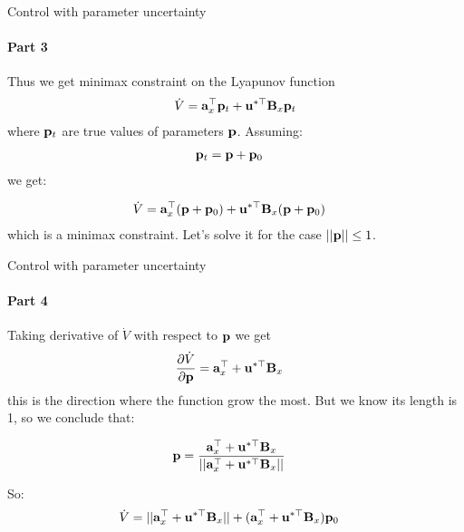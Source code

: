\documentclass{beamer}
\begin{document}
\begin{frame}{Control with parameter uncertainty}
\framesubtitle{Part 3}
\begin{flushleft}

Thus we get minimax constraint on the Lyapunov function
%
\begin{align}
\dot{V} = \mathbf{a}_x^\top \mathbf{p}_t + 
\mathbf{u}^{*\top} \mathbf{B}_x \mathbf{p}_t
\end{align}
%
where $\mathbf{p}_t$ are true values of parameters $\mathbf{p}$. Assuming:
%
\begin{align}
& \mathbf{p}_t = \mathbf{p} + \mathbf{p}_0
\end{align}
%
we get:

\begin{align}
& \dot{V} = \mathbf{a}_x^\top (\mathbf{p} + \mathbf{p}_0) + 
\mathbf{u}^{*\top} \mathbf{B}_x (\mathbf{p} + \mathbf{p}_0)
\end{align}
%
which is a minimax constraint. Let's solve it for the case $||\mathbf{p}|| \leq 1$.

\end{flushleft}
\end{frame}



\begin{frame}{Control with parameter uncertainty}
\framesubtitle{Part 4}
\begin{flushleft}
Taking derivative of $\dot{V}$ with respect to $\mathbf{p}$ we get 
%
\begin{align}
& \frac{\partial \dot{V}}{\partial  \mathbf{p}}  = \mathbf{a}_x^\top  + 
\mathbf{u}^{*\top} \mathbf{B}_x
\end{align}
%
this is the direction where the function grow the most. But we know its length is 1, so we conclude that:

\begin{align}
& \mathbf{p}  = \frac{\mathbf{a}_x^\top  + 
\mathbf{u}^{*\top} \mathbf{B}_x}{|| \mathbf{a}_x^\top  + 
\mathbf{u}^{*\top} \mathbf{B}_x ||}
\end{align}

So:
%
\begin{align}
& \dot{V} = 
|| \mathbf{a}_x^\top  + 
\mathbf{u}^{*\top} \mathbf{B}_x ||
+
(\mathbf{a}_x^\top + 
\mathbf{u}^{*\top} \mathbf{B}_x) \mathbf{p}_0
\end{align}

\end{flushleft}
\end{frame}
\end{document}
